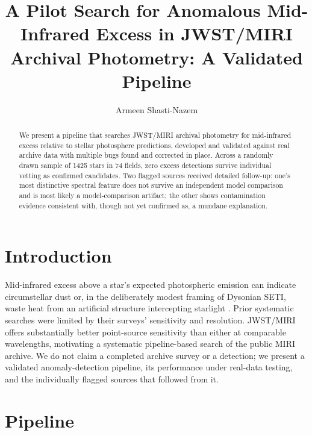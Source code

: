 \documentclass[RNAAS]{aastex7}
\begin{document}
\title{A Pilot Search for Anomalous Mid-Infrared Excess in JWST/MIRI Archival Photometry: A Validated Pipeline}

\author[0009-0006-7506-5070]{Armeen Shasti-Nazem}

\begin{abstract}
We present a pipeline that searches JWST/MIRI archival photometry for
mid-infrared excess relative to stellar photosphere predictions,
developed and validated against real archive data with multiple bugs
found and corrected in place. Across a randomly drawn sample of 1425
stars in 74 fields, zero excess detections survive individual vetting
as confirmed candidates. Two flagged sources received detailed
follow-up: one's most distinctive spectral feature does not survive an
independent model comparison and is most likely a model-comparison
artifact; the other shows contamination evidence consistent with,
though not yet confirmed as, a mundane explanation.
\end{abstract}


\section{Introduction}

Mid-infrared excess above a star's expected photospheric emission can
indicate circumstellar dust or, in the deliberately modest framing of
Dysonian SETI, waste heat from an artificial structure intercepting
starlight \citep{Wright2014}. Prior systematic searches
\citep[IRAS;][]{Carrigan2009} \citep[WISE;][]{Griffith2015} were
limited by their surveys' sensitivity and resolution. JWST/MIRI offers
substantially better point-source sensitivity than either at
comparable wavelengths, motivating a systematic pipeline-based search
of the public MIRI archive. We do not claim a completed
archive survey or a detection; we present a validated
anomaly-detection pipeline, its performance under real-data testing,
and the individually flagged sources that followed from it.

\section{Pipeline}
\end{document}
